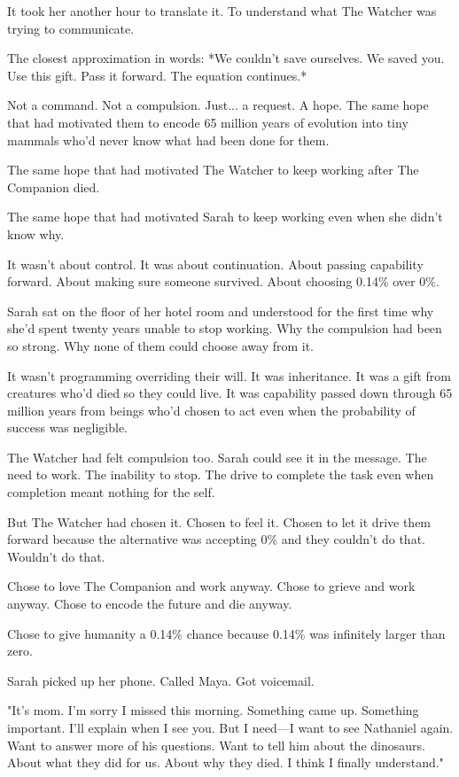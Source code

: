 It took her another hour to translate it. To understand what The Watcher was trying to communicate.

The closest approximation in words: *We couldn't save ourselves. We saved you. Use this gift. Pass it forward. The equation continues.*

Not a command. Not a compulsion. Just... a request. A hope. The same hope that had motivated them to encode 65 million years of evolution into tiny mammals who'd never know what had been done for them.

The same hope that had motivated The Watcher to keep working after The Companion died.

The same hope that had motivated Sarah to keep working even when she didn't know why.

It wasn't about control. It was about continuation. About passing capability forward. About making sure someone survived. About choosing 0.14\% over 0\%.

Sarah sat on the floor of her hotel room and understood for the first time why she'd spent twenty years unable to stop working. Why the compulsion had been so strong. Why none of them could choose away from it.

It wasn't programming overriding their will. It was inheritance. It was a gift from creatures who'd died so they could live. It was capability passed down through 65 million years from beings who'd chosen to act even when the probability of success was negligible.

The Watcher had felt compulsion too. Sarah could see it in the message. The need to work. The inability to stop. The drive to complete the task even when completion meant nothing for the self.

But The Watcher had chosen it. Chosen to feel it. Chosen to let it drive them forward because the alternative was accepting 0\% and they couldn't do that. Wouldn't do that.

Chose to love The Companion and work anyway. Chose to grieve and work anyway. Chose to encode the future and die anyway.

Chose to give humanity a 0.14\% chance because 0.14\% was infinitely larger than zero.

Sarah picked up her phone. Called Maya. Got voicemail.

"It's mom. I'm sorry I missed this morning. Something came up. Something important. I'll explain when I see you. But I need—I want to see Nathaniel again. Want to answer more of his questions. Want to tell him about the dinosaurs. About what they did for us. About why they died. I think I finally understand."

